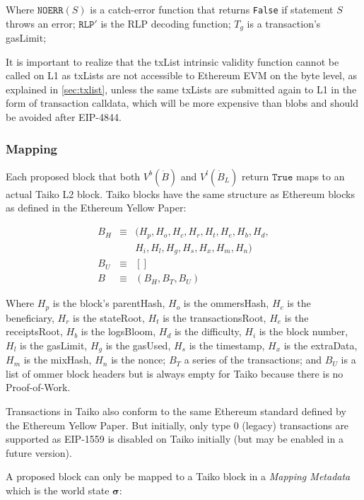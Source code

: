\documentclass[9pt,oneside]{amsart}
\begin{document}
\begin{multicols}{2}
Where $\texttt{NOERR}(S)$ is a catch-error function that returns \texttt{False} if statement $S$ throws an error; $\texttt{RLP}'$ is the RLP decoding function;  $T_g$ is a transaction's gasLimit; 


It is important to realize that the txList intrinsic validity function cannot be called on L1 as txLists are not accessible to Ethereum EVM on the byte level, as explained in \ref{sec:txlist}, unless the same txLists are submitted again to L1 in the form of transaction calldata, which will be more expensive than blobs and should be avoided after EIP-4844.

\subsubsection{Mapping}

Each proposed block that both $V^b(\dot{B})$ and $V^l(\dot{B}_L)$ return $\texttt{True}$ maps to an actual Taiko L2 block. Taiko blocks have the same structure as Ethereum blocks as defined in the Ethereum Yellow Paper\cite{ethyellowpaper}:

\begin{eqnarray}
B_H & \equiv & (H_p, H_o, H_c, H_r, H_t, H_e, H_b, H_d, \\
\nonumber & & H_i, H_l,H_g, H_s, H_x, H_m, H_n) \\
B_U  & \equiv & [] \\
B & \equiv & (B_H, B_T, B_U)
\end{eqnarray}

Where $H_p$ is the block's parentHash, $H_o$ is the ommersHash, $H_c$ is the beneficiary, $H_r$ is the stateRoot, $H_t$ is the transactionsRoot, $H_e$ is the receiptsRoot, $H_b$ is the logsBloom, $H_d$ is the difficulty, $H_i$ is the block number, $H_l$ is the gasLimit, $H_g$ is the gasUsed, $H_s$ is the timestamp, $H_x$ is the extraData, $H_m$ is the mixHash, $H_n$ is the nonce; $B_T$ a series of the transactions; and $B_U$ is a list of ommer block headers but is always empty for Taiko because there is no Proof-of-Work.

Transactions in Taiko also conform to the same Ethereum standard defined by the Ethereum Yellow Paper. But initially, only type 0 (legacy)  transactions are supported as EIP-1559 is disabled on Taiko initially (but may be enabled in a future version).

A proposed block can only be mapped to a Taiko block in a \textit{Mapping Metadata} which is the world state $\boldsymbol{\sigma}$:


\end{multicols}
\end{document}
